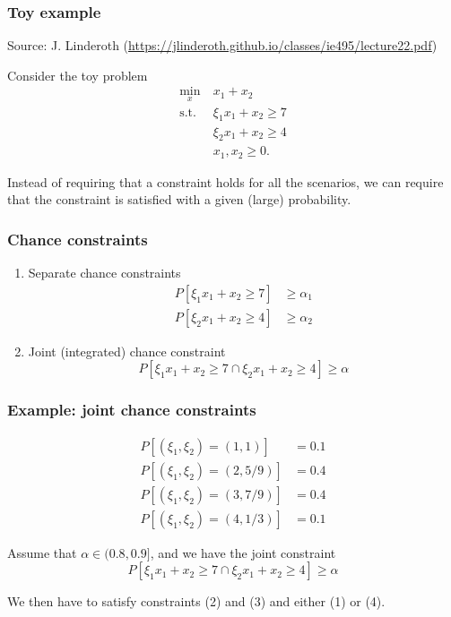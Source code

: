 \documentclass{beamer}
\begin{document}
\begin{frame}
\frametitle{Toy example}

Source: J. Linderoth (\url{https://jlinderoth.github.io/classes/ie495/lecture22.pdf})

\mbox{}

Consider the toy problem
\begin{align*}
\min_x\ & x_1 + x_2 \\
\mbox{s.t. } & \xi_1 x_1 + x_2 \geq 7 \\
& \xi_2 x_1 + x_2 \geq 4 \\
& x_1, x_2 \geq 0.
\end{align*}

\mbox{} 

Instead of requiring that a constraint holds for all the scenarios, we can require that the constraint is satisfied with a given (large) probability.

\end{frame}

\begin{frame}
\frametitle{Chance constraints}

\begin{enumerate}
\item 
Separate chance constraints
\begin{align*}
P [ \xi_1x_1 + x_2 \geq 7 ] &\geq \alpha_1 \\
P [ \xi_2x_1 + x_2 \geq 4 ] &\geq \alpha_2
\end{align*}
\item
Joint (integrated) chance constraint
\[
P [ \xi_1x_1 + x_2 \geq 7 \cap \xi_2x_1 + x_2 \geq 4 ] \geq \alpha
\]
\end{enumerate}

\end{frame}

\begin{frame}
\frametitle{Example: joint chance constraints}

\begin{align}
P[(\xi_1, \xi_2) = (1,1)] &= 0.1 \\
P[(\xi_1, \xi_2) = (2,5/9)] &= 0.4 \\
P[(\xi_1, \xi_2) = (3,7/9)] &= 0.4 \\
P[(\xi_1, \xi_2) = (4,1/3)] &= 0.1
\end{align}

\mbox{}

Assume that $\alpha \in (0.8,0.9]$, and we have the joint constraint
\[
P [ \xi_1x_1 + x_2 \geq 7 \cap \xi_2x_1 + x_2 \geq 4 ] \geq \alpha
\]

\mbox{}

We then have to satisfy constraints (2) and (3) and either (1) or (4).

\end{frame}
\end{document}
